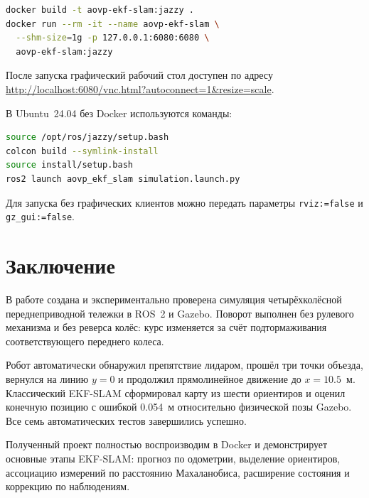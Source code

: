 \documentclass[a4paper,12pt]{article}
\begin{document}
\begin{lstlisting}[language=bash]
docker build -t aovp-ekf-slam:jazzy .
docker run --rm -it --name aovp-ekf-slam \
  --shm-size=1g -p 127.0.0.1:6080:6080 \
  aovp-ekf-slam:jazzy
\end{lstlisting}

После запуска графический рабочий стол доступен по адресу
\url{http://localhost:6080/vnc.html?autoconnect=1\&resize=scale}.

В Ubuntu~24.04 без Docker используются команды:

\begin{lstlisting}[language=bash]
source /opt/ros/jazzy/setup.bash
colcon build --symlink-install
source install/setup.bash
ros2 launch aovp_ekf_slam simulation.launch.py
\end{lstlisting}

Для запуска без графических клиентов можно передать параметры
\texttt{rviz:=false} и \texttt{gz\_gui:=false}.

\section{Заключение}

В работе создана и экспериментально проверена симуляция четырёхколёсной
переднеприводной тележки в ROS~2 и Gazebo. Поворот выполнен без рулевого
механизма и без реверса колёс: курс изменяется за счёт подтормаживания
соответствующего переднего колеса.

Робот автоматически обнаружил препятствие лидаром, прошёл три точки объезда,
вернулся на линию $y=0$ и продолжил прямолинейное движение до $x=10.5$~м.
Классический EKF-SLAM сформировал карту из шести ориентиров и оценил конечную
позицию с ошибкой 0.054~м относительно физической позы Gazebo. Все семь
автоматических тестов завершились успешно.

Полученный проект полностью воспроизводим в Docker и демонстрирует основные
этапы EKF-SLAM: прогноз по одометрии, выделение ориентиров,
ассоциацию измерений по расстоянию Махаланобиса, расширение состояния и
коррекцию по наблюдениям.
\end{document}
